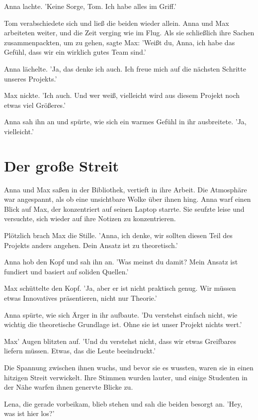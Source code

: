 \documentclass[12pt]{article}
\begin{document}
Anna lachte. 'Keine Sorge, Tom. Ich habe alles im Griff.'

Tom verabschiedete sich und ließ die beiden wieder allein. Anna und Max arbeiteten weiter, und die Zeit verging wie im Flug. Als sie schließlich ihre Sachen zusammenpackten, um zu gehen, sagte Max: 'Weißt du, Anna, ich habe das Gefühl, dass wir ein wirklich gutes Team sind.'

Anna lächelte. 'Ja, das denke ich auch. Ich freue mich auf die nächsten Schritte unseres Projekts.'

Max nickte. 'Ich auch. Und wer weiß, vielleicht wird aus diesem Projekt noch etwas viel Größeres.'

Anna sah ihn an und spürte, wie sich ein warmes Gefühl in ihr ausbreitete. 'Ja, vielleicht.'

\section{ Der große Streit }
 Anna und Max saßen in der Bibliothek, vertieft in ihre Arbeit. Die Atmosphäre war angespannt, als ob eine unsichtbare Wolke über ihnen hing. Anna warf einen Blick auf Max, der konzentriert auf seinen Laptop starrte. Sie seufzte leise und versuchte, sich wieder auf ihre Notizen zu konzentrieren.

Plötzlich brach Max die Stille. 'Anna, ich denke, wir sollten diesen Teil des Projekts anders angehen. Dein Ansatz ist zu theoretisch.'

Anna hob den Kopf und sah ihn an. 'Was meinst du damit? Mein Ansatz ist fundiert und basiert auf soliden Quellen.'

Max schüttelte den Kopf. 'Ja, aber er ist nicht praktisch genug. Wir müssen etwas Innovatives präsentieren, nicht nur Theorie.'

Anna spürte, wie sich Ärger in ihr aufbaute. 'Du verstehst einfach nicht, wie wichtig die theoretische Grundlage ist. Ohne sie ist unser Projekt nichts wert.'

Max' Augen blitzten auf. 'Und du verstehst nicht, dass wir etwas Greifbares liefern müssen. Etwas, das die Leute beeindruckt.'

Die Spannung zwischen ihnen wuchs, und bevor sie es wussten, waren sie in einen hitzigen Streit verwickelt. Ihre Stimmen wurden lauter, und einige Studenten in der Nähe warfen ihnen genervte Blicke zu.

Lena, die gerade vorbeikam, blieb stehen und sah die beiden besorgt an. 'Hey, was ist hier los?'
\end{document}
